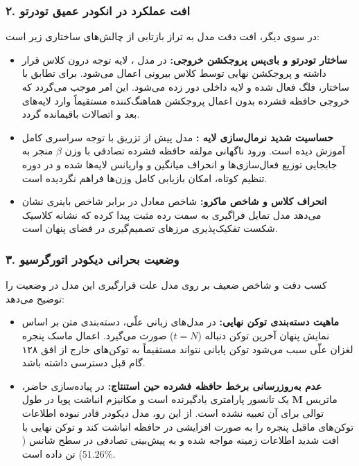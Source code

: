 \subsubsection*{۲. افت عملکرد در انکودر عمیق تودرتو  }
در سوی دیگر، افت دقت مدل  به تراز  بازتابی از چالش‌های ساختاری زیر است:
\begin{itemize}
    \item \textbf{ساختار تودرتو و بای‌پس پروجکشن خروجی:} در مدل ، لایه توجه درون کلاس  قرار داشته و پروجکشن نهایی توسط کلاس بیرونی  اعمال می‌شود. برای تطابق با ساختار، فلگ  فعال شده و لایه  داخلی دور زده می‌شود. این امر موجب می‌گردد که خروجی حافظه فشرده بدون اعمال پروجکشن هماهنگ‌کننده مستقیماً وارد لایه‌های بعد و اتصالات باقیمانده  گردد.
    \item \textbf{حساسیت شدید نرمال‌سازی لایه :} مدل  پیش از تزریق با توجه سراسری کامل آموزش دیده است. ورود ناگهانی مولفه حافظه فشرده تصادفی با وزن $\beta$ منجر به جابجایی توزیع فعال‌سازی‌ها  و انحراف میانگین و واریانس لایه‌ها شده و در دوره تنظیم کوتاه، امکان بازیابی کامل وزن‌ها فراهم نگردیده است.
    \item \textbf{انحراف کلاس و شاخص ماکرو:} شاخص  معادل  در برابر شاخص باینری  نشان می‌دهد مدل تمایل فراگیری به سمت رده مثبت پیدا کرده که نشانه کلاسیک شکست تفکیک‌پذیری مرزهای تصمیم‌گیری در فضای پنهان است.
\end{itemize}

\subsubsection*{۳. وضعیت بحرانی دیکودر اتورگرسیو  }
کسب دقت  و شاخص ضعیف  بر روی مدل  علت قرارگیری این مدل در وضعیت  را توضیح می‌دهد:
\begin{itemize}
    \item \textbf{ماهیت دسته‌بندی توکن نهایی:} در مدل‌های زبانی علّی، دسته‌بندی متن بر اساس نمایش پنهان آخرین توکن دنباله ($t=N$) صورت می‌گیرد. اعمال ماسک پنجره لغزان علّی سبب می‌شود توکن پایانی نتواند مستقیماً به توکن‌های خارج از افق ۱۲۸ گام قبل دسترسی داشته باشد.
    \item \textbf{عدم به‌روزرسانی برخط حافظه فشرده حین استنتاج:} در پیاده‌سازی حاضر، ماتریس $\mathbf{M}$ یک تانسور پارامتری یادگیرنده است و مکانیزم انباشت پویا  در طول توالی برای آن تعبیه نشده است. از این رو، مدل دیکودر قادر نبوده اطلاعات توکن‌های ماقبل پنجره را به صورت افزایشی در حافظه انباشت کند و توکن نهایی با افت شدید اطلاعات زمینه مواجه شده و به پیش‌بینی تصادفی در سطح شانس ($51.26\%$) تن داده است.
\end{itemize}

